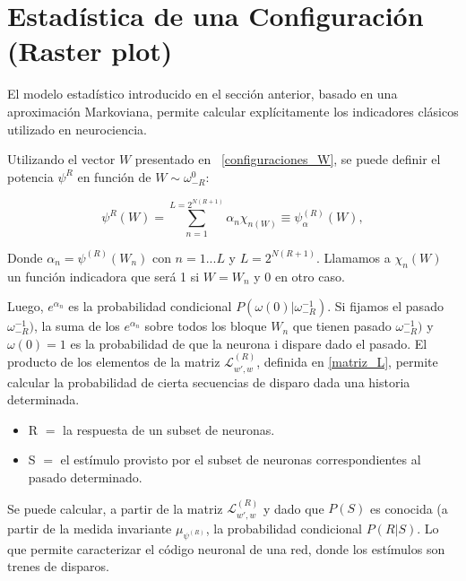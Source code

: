 \section{Estadística de una Configuración (Raster plot)}

El modelo estadístico introducido en el sección anterior, basado en una aproximación Markoviana, permite calcular explícitamente los indicadores clásicos utilizado en neurociencia.

Utilizando el vector $W$ presentado en ~\ref{configuraciones_W}, se puede definir el potencia $\psi^{R}$ en función de $W \sim \omega_{-R}^0$:

\begin{equation}
    \psi^{R}(W) = \sum^{L=2^{N(R+1)}}_{n=1} \alpha_n \chi_{n(W)} \equiv \psi_{\alpha}^{(R)}(W),
\end{equation}

Donde $\alpha_n = \psi^{(R)}(W_n)$ con $n=1...L$ y $L=2^{N(R+1)}$. Llamamos a $\chi_n(W)$ un función indicadora que será 1 si $W=W_n$ y 0 en otro caso. 

Luego, $e^{\alpha_n}$ es la probabilidad condicional $P(\omega(0)|\omega^{-1}_{-R})$. Si fijamos el pasado $\omega^{-1}_{-R})$, la suma de los $e^{\alpha_n}$ sobre todos los bloque $W_n$ que tienen pasado $\omega^{-1}_{-R})$ y $\omega(0)=1$ es la probabilidad de que la neurona i dispare dado el pasado. El producto de los elementos de la matriz $\mathcal{L}^{(R)}_{w',w}$, definida en \ref{matriz_L}, permite calcular la probabilidad de cierta secuencias de disparo dada una historia determinada.

\begin{itemize}
    \item R $=$ la respuesta de un subset de neuronas.
    \item S $=$ el estímulo provisto por el subset de neuronas correspondientes al pasado determinado.
\end{itemize}

Se puede calcular, a partir de la matriz $\mathcal{L}^{(R)}_{w',w}$ y dado que $P(S)$ es conocida (a partir de la medida invariante $\mu_{\psi^{(R)}}$, la probabilidad condicional $P(R|S)$. Lo que permite caracterizar el código neuronal de una red, donde los estímulos son trenes de disparos. 

